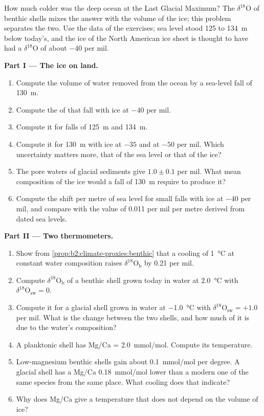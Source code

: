 \begin{problem}\label{pb:b2:climate-proxies:1}
How much colder was the deep ocean at the Last Glacial Maximum? The $\delta^{18}$O of benthic shells
mixes the answer with the volume of the ice; this problem separates the two. Use the data of the
exercises; sea level stood 125 to \qty{134}{m} below today's, and the ice of the North American ice
sheet is thought to have had a $\delta^{18}$O of about $-40$ per mil.

\medskip\noindent\textbf{Part I --- The ice on land.}
\begin{enumerate}
  \item Compute the volume of water removed from the ocean by a sea-level fall of \qty{130}{m}.
  \item Compute the  of that fall with ice at $-40$ per mil.
  \item Compute it for falls of \qty{125}{m} and \qty{134}{m}.
  \item Compute it for \qty{130}{m} with ice at $-35$ and at $-50$ per mil. Which uncertainty
        matters more, that of the sea level or that of the ice?
  \item The pore waters of glacial sediments give $1.0 \pm 0.1$ per mil. What mean composition
        of the ice would a fall of \qty{130}{m} require to produce it?
  \item Compute the shift per metre of sea level for small falls with ice at $-40$ per mil, and
        compare with the value of \num{0.011} per mil per metre derived from dated sea levels.
\end{enumerate}

\medskip\noindent\textbf{Part II --- Two thermometers.}
\begin{enumerate}[resume]
  \item Show from \cref{prop:b2:climate-proxies:benthic} that a cooling of \qty{1}{\celsius} at
        constant water composition raises $\delta^{18}\mathrm{O}_{\mathrm{b}}$ by \num{0.21} per mil.
  \item Compute $\delta^{18}\mathrm{O}_{\mathrm{b}}$ of a benthic shell grown today in water at
        \qty{2.0}{\celsius} with $\delta^{18}\mathrm{O}_{\mathrm{sw}} = 0$.
  \item Compute it for a glacial shell grown in water at \qty{-1.0}{\celsius} with
        $\delta^{18}\mathrm{O}_{\mathrm{sw}} = +1.0$ per mil. What is the change between the two
        shells, and how much of it is due to the water's composition?
  \item A planktonic shell has Mg/Ca = \qty{2.0}{mmol/mol}. Compute its temperature.
  \item Low-magnesium benthic shells gain about \qty{0.1}{mmol/mol} per degree. A glacial shell has
        a Mg/Ca \qty{0.18}{mmol/mol} lower than a modern one of the same species from the same
        place. What cooling does that indicate?
  \item Why does Mg/Ca give a temperature that does not depend on the volume of ice?
\end{enumerate}


\end{problem}
